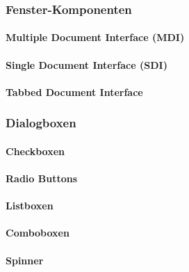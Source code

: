 \documentclass[a4paper, 11pt, accentcolor = tud3b]{tudreport}
\begin{document}
				\subsubsection{Fenster-Komponenten} %

					\paragraph{Multiple Document Interface (MDI)} %

					\paragraph{Single Document Interface (SDI)} %

					\paragraph{Tabbed Document Interface} %

				\subsubsection{Dialogboxen} %

					\paragraph{Checkboxen} %

					\paragraph{Radio Buttons} %

					\paragraph{Listboxen} %

					\paragraph{Comboboxen} %

					\paragraph{Spinner} %
\end{document}
